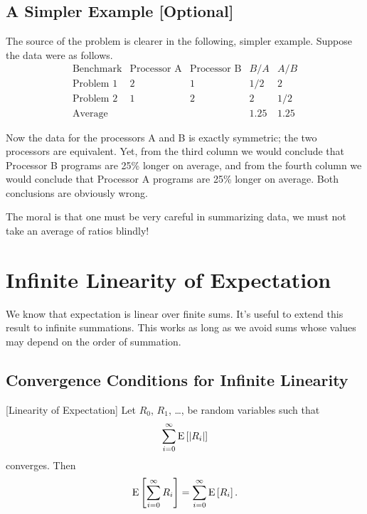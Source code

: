\documentclass[11pt,twoside]{article}
\begin{document}
\subsection{A Simpler Example [Optional]}

\begin{optional}

The source of the problem is clearer in the following, simpler example.
Suppose the data were as follows.
\[
\begin{array}{lcccc}
\text{Benchmark}        & \text{Processor A}    & \text{Processor B}
                        & B / A                 & A / B  \\
\hline
\text{Problem 1}        & 2                     & 1             
                        & 1/2                   & 2 \\
\text{Problem 2}        & 1                     & 2
                        & 2                     & 1/2 \\
\hline
\text{Average}          &                       &
                        & 1.25                  & 1.25
\end{array}
\]

Now the data for the processors A and B is exactly symmetric; the two
processors are equivalent.  Yet, from the third column we would
conclude that Processor B programs are 25\% longer on average, and
from the fourth column we would conclude that Processor A programs are
25\% longer on average.  Both conclusions are obviously wrong.

The moral is that one must be very careful in summarizing data, we must
not take an average of ratios blindly!

\end{optional}

\section{Infinite Linearity of Expectation}

We know that expectation is linear over finite sums.  It's useful to
extend this result to infinite summations.  This works as long as we avoid
sums whose values may depend on the order of summation.

\subsection{Convergence Conditions for Infinite Linearity}

\begin{theorem}\label{linexp} [Linearity of Expectation]
Let $R_0$, $R_1$, \dots, be random variables such that
\[
\sum_{i = 0}^\infty \mathop{\textup{E}}\nolimits\left[\left|R_i\right|\right]
\]
converges.  Then
\[
   \mathop{\textup{E}}\nolimits\left[\sum_{i = 0}^\infty R_i\right] = \sum_{i = 0}^\infty \mathop{\textup{E}}\nolimits\left[R_i\right].
\]
\end{theorem}
\end{document}
